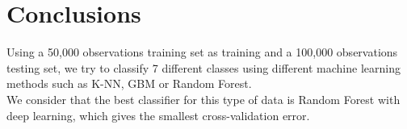 \documentclass[paper=a4, fontsize=12pt]{scrartcl}
\numberwithin{equation}{section}
\numberwithin{figure}{section}
\numberwithin{table}{section}
\begin{document}

\section{Conclusions}
Using a 50,000 observations training set as training and a 100,000 observations testing set, we try to classify 7 different classes using different machine learning methods such as K-NN, GBM or Random Forest.\\
We consider that the best classifier for this type of data is Random Forest with deep learning, which gives the smallest cross-validation error. 

\newpage

	
\end{document}
